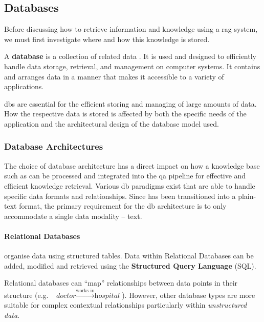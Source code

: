 \subsection{Databases}\label{subsec:db}
%
Before discussing how to retrieve information and knowledge using a \ac{rag} system, we must first investigate where and how this knowledge is stored.
\begin{definition}\label{def:database}
    A \textbf{database} is a collection of related data \citep{limited2010introduction}. 
    It is used and designed to efficiently handle data storage, retrieval, and management on computer systems. 
    It contains and arranges data in a manner that makes it accessible to a variety of applications.
\end{definition}
\acp{db} are essential for the efficient storing and managing of large amounts of data. 
How the respective data is stored is affected by both the specific needs of the application and the architectural design of the database model used.
%
\subsubsection{Database Architectures}\label{sec:db_architectures}
The choice of database architecture has a direct impact on how a knowledge base such as \citet{bb2} can be processed and integrated into the \ac{qa} pipeline for effective and efficient knowledge retrieval. 
Various \ac{db} paradigms exist that are able to handle specific data formats and relationships.
Since  has been transitioned into a plain-text format, the primary requirement for the \ac{db} architecture is to only accommodate a single data modality -- text.
%
\paragraph{Relational Databases}\label{par:rela_db} organise data using structured tables.
Data within Relational Databases can be added, modified and retrieved using the \textbf{Structured Query Language} (SQL).

Relational databases can \enquote{map} relationships between data points in their structure (e.g. ~$\textit{doctor} \xrightarrow{\text{works in}} \textit{hospital}$).
However, other database types are more suitable for complex contextual relationships particularly within \textit{unstructured data}.
%
